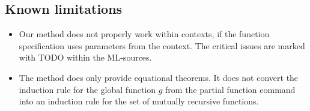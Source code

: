 \documentclass[11pt,a4paper]{article}
\begin{document}
\subsection{Known limitations}
\begin{itemize}
\item 
Our method does not properly work within contexts, if the function 
specification uses parameters from the 
context. The critical issues are marked with TODO within the ML-sources.
\item The method does only provide equational theorems. It does not convert
  the induction rule for the global function $g$ from the partial function command
  into an induction rule for the set of mutually recursive functions.
\end{itemize}
 





\end{document}
